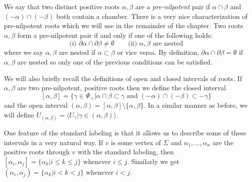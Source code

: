 \documentclass[class=book, crop=false,12 pt]{standalone}
\begin{document}
We say that two distinct positive roots $\alpha,\beta$ are  a \emph{pre-nilpotent} pair if $\alpha\cap \beta$ and $(-\alpha)\cap (-\beta)$ both contain a chamber. There is a very nice characterization of pre-nilpotent roots which we will use in the remainder of the chapter. Two roots $\alpha,\beta$ form a pre-nilpotent pair if and only if one of the following holds:
\[
	\text{(i) }\partial \alpha \cap \partial \beta \neq \emptyset\qquad \text{(ii) } \alpha,\beta \text{ are nested}
\]
where we say $\alpha,\beta$ are nested if $\alpha \subset \beta$ or vice versa. By definition, $\partial \alpha \cap \partial \beta=\emptyset$ if $\alpha,\beta$ are nested so only one of the previous conditions can be satisfied.

We will also briefly recall the definitions of open and closed intervals of roots. If $\alpha,\beta$ are two pre-nilpotent, positive roots then we define the closed interval
\[
	[\alpha,\beta]=\{\gamma\in \Phi_+|\alpha\cap\beta\subset \gamma\text{ and }(-\alpha)\cap (-\beta)\subset -\gamma\}
\]
and the open interval $(\alpha,\beta)=[\alpha,\beta]\setminus\{\alpha,\beta\}.$ In a similar manner as before, we will define $U_{(\alpha,\beta)}=\langle U_\gamma|\gamma\in (\alpha,\beta)\rangle.$

One feature of the standard labeling is that it allows us to describe some of these intervals in a very natural way. If $v$ is some vertex of $\Sigma$ and $\alpha_1,\dots,\alpha_n$ are the positive roots through $v$ with the standard labeling, then $[\alpha_i,\alpha_j]=\{\alpha_k|i\le k \le j\}$ whenever $i\le j.$ Similarly we get $(\alpha_i,\alpha_j)=\{\alpha_k|i<k<j\}$ whenever $i<j.$

\end{document}
